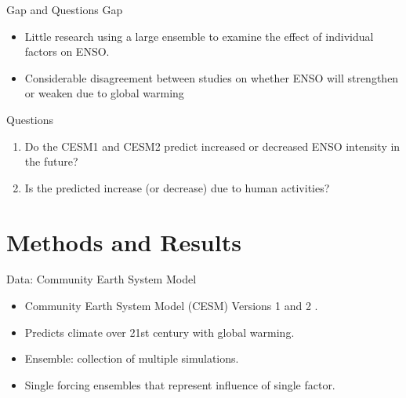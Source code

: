\documentclass[aspectratio=1610]{beamer}
\begin{document}
\begin{frame}{Gap and Questions}
  \alert{Gap}
  \begin{itemize}
  \item Little research using a large ensemble to examine the effect of individual factors on ENSO.
  \item Considerable disagreement between studies on whether ENSO will strengthen or weaken due to global warming
  \end{itemize}
  \alert{Questions}
  \begin{enumerate}
  \item Do the CESM1 and CESM2 predict increased or decreased ENSO intensity in the future?
  \item Is the predicted increase (or decrease) due to human activities?
  \end{enumerate}
\end{frame}

\section{Methods and Results}

\begin{frame}{Data: Community Earth System Model}
  \begin{itemize}
  \item Community Earth System Model (CESM) Versions 1 and 2 \citep{kay2015community} \citep{danabasoglu2020community}.
  \item Predicts climate over 21st century with global warming.
  \item Ensemble: collection of multiple simulations.
  \item Single forcing ensembles that represent influence of single factor.
  \end{itemize}
\end{frame}
\end{document}
